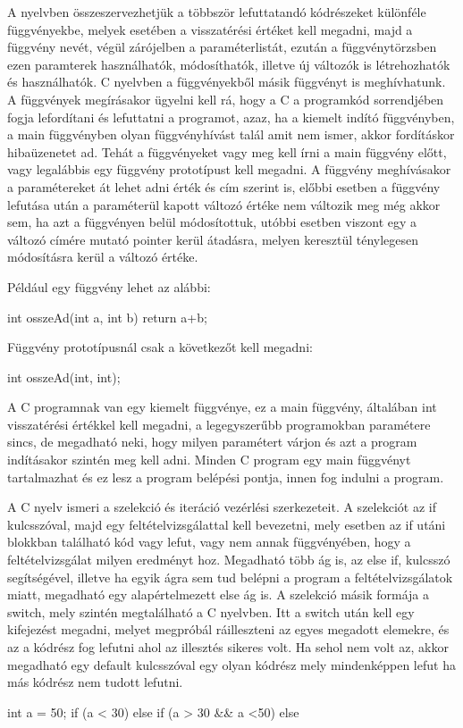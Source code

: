 A nyelvben összeszervezhetjük a többször lefuttatandó kódrészeket különféle függvényekbe, melyek esetében a visszatérési értéket kell megadni, majd a függvény nevét, végül zárójelben a paraméterlistát, ezután a függvénytörzsben ezen paramterek használhatók, módosíthatók, illetve új változók is létrehozhatók és használhatók. C nyelvben a függvényekből másik függvényt is meghívhatunk. A függvények megírásakor ügyelni kell rá, hogy a C a programkód sorrendjében fogja lefordítani és lefuttatni a programot, azaz, ha a kiemelt indító függvényben, a main függvényben olyan függvényhívást talál amit nem ismer, akkor fordításkor hibaüzenetet ad. Tehát a függvényeket vagy meg kell írni a main függvény előtt, vagy legalábbis egy függvény prototípust kell megadni. A függvény meghívásakor a paramétereket át lehet adni érték és cím szerint is, előbbi esetben a függvény lefutása után a paraméterül kapott változó értéke nem változik meg még akkor sem, ha azt a függvényen belül módosítottuk, utóbbi esetben viszont egy a változó címére mutató pointer kerül átadásra, melyen keresztül ténylegesen módosításra kerül a változó értéke.

Például egy függvény lehet az alábbi:
\begin{cpp}
int osszeAd(int a, int b) {
	return a+b;
}
\end{cpp}

Függvény prototípusnál csak a következőt kell megadni:
\begin{cpp}
int osszeAd(int, int);
\end{cpp}

A C programnak van egy kiemelt függvénye, ez a main függvény, általában int visszatérési értékkel kell megadni, a legegyszerűbb programokban paramétere sincs, de megadható neki, hogy milyen paramétert várjon és azt a program indításakor szintén meg kell adni.
Minden C program egy main függvényt tartalmazhat és ez lesz a program belépési pontja, innen fog indulni a program.

A C nyelv ismeri a szelekció és iteráció vezérlési szerkezeteit. A szelekciót az if kulcsszóval, majd egy feltételvizsgálattal kell bevezetni, mely esetben az if utáni blokkban található kód vagy lefut, vagy nem annak függvényében, hogy a feltételvizsgálat milyen eredményt hoz. Megadható több ág is, az else if, kulcsszó segítségével, illetve ha egyik ágra sem tud belépni a program a feltételvizsgálatok miatt, megadható egy alapértelmezett else ág is. A szelekció másik formája a switch, mely szintén megtalálható a C nyelvben. Itt a switch után kell egy kifejezést megadni, melyet megpróbál ráilleszteni az egyes megadott elemekre, és az a kódrész fog lefutni ahol az illesztés sikeres volt. Ha sehol nem volt az, akkor megadható egy default kulcsszóval egy olyan kódrész mely mindenképpen lefut ha más kódrész nem tudott lefutni.
\begin{cpp}
int a = 50;
if (a < 30) {
}
else if (a > 30 && a <50) {
}
else {
}
\end{cpp}

